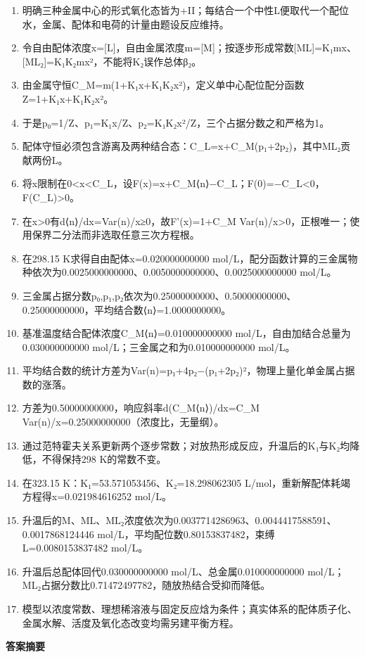 \documentclass[UTF8,11pt,a4paper]{ctexart}
\begin{document}
\begin{enumerate}
\item 明确三种金属中心的形式氧化态皆为+II；每结合一个中性L便取代一个配位水，金属、配体和电荷的计量由题设反应维持。
\item 令自由配体浓度x=[L]，自由金属浓度m=[M]；按逐步形成常数[ML]=K₁mx、[ML₂]=K₁K₂mx²，不能将K₂误作总体β₂。
\item 由金属守恒C\_M=m(1+K₁x+K₁K₂x²)，定义单中心配位配分函数Z=1+K₁x+K₁K₂x²。
\item 于是p₀=1/Z、p₁=K₁x/Z、p₂=K₁K₂x²/Z，三个占据分数之和严格为1。
\item 配体守恒必须包含游离及两种结合态：C\_L=x+C\_M(p₁+2p₂)，其中ML₂贡献两份L。
\item 将x限制在0<x<C\_L，设F(x)=x+C\_M⟨n⟩−C\_L；F(0)=−C\_L<0，F(C\_L)>0。
\item 在x>0有d⟨n⟩/dx=Var(n)/x≥0，故F'(x)=1+C\_M Var(n)/x>0，正根唯一；使用保界二分法而非选取任意三次方程根。
\item 在298.15 K求得自由配体x=0.020000000000 mol/L，配分函数计算的三金属物种依次为0.0025000000000、0.0050000000000、0.0025000000000 mol/L。
\item 三金属占据分数p₀,p₁,p₂依次为0.25000000000、0.50000000000、0.25000000000，平均结合数⟨n⟩=1.0000000000。
\item 基准温度结合配体浓度C\_M⟨n⟩=0.010000000000 mol/L，自由加结合总量为0.030000000000 mol/L；三金属之和为0.010000000000 mol/L。
\item 平均结合数的统计方差为Var(n)=p₁+4p₂−(p₁+2p₂)²，物理上量化单金属占据数的涨落。
\item 方差为0.50000000000，响应斜率d(C\_M⟨n⟩)/dx=C\_M Var(n)/x=0.25000000000（浓度比，无量纲）。
\item 通过范特霍夫关系更新两个逐步常数；对放热形成反应，升温后的K₁与K₂均降低，不得保持298 K的常数不变。
\item 在323.15 K：K₁=53.571053456、K₂=18.298062305 L/mol，重新解配体耗竭方程得x=0.021984616252 mol/L。
\item 升温后的M、ML、ML₂浓度依次为0.0037714286963、0.0044417588591、0.0017868124446 mol/L，平均配位数0.80153837482，束缚L=0.0080153837482 mol/L。
\item 升温后总配体回代0.030000000000 mol/L、总金属0.010000000000 mol/L；ML₂占据分数比0.71472497782，随放热结合受抑而降低。
\item 模型以浓度常数、理想稀溶液与固定反应焓为条件；真实体系的配体质子化、金属水解、活度及氧化态改变均需另建平衡方程。
\end{enumerate}
\noindent\textbf{答案摘要}\par
\end{document}
